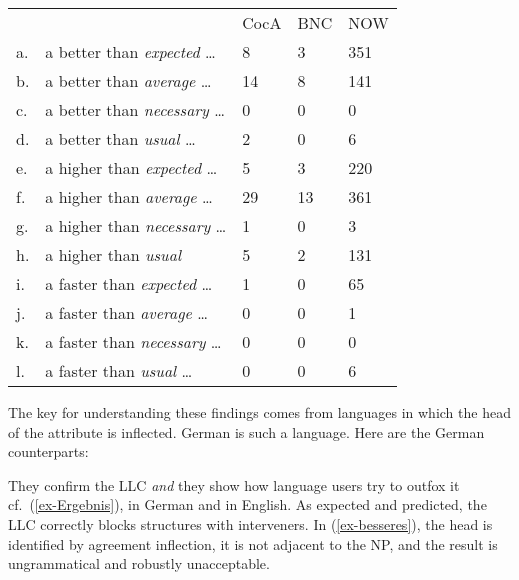 \documentclass[output=paper
  ,nobabel
  ,uniformtopskip %
]{langscibook}
\begin{document}
\ea\label{ex-than}
\begin{tabular}[t]{lllll}
& & CocA & BNC & NOW\\
a. & a better than \emph{expected} \ldots & 8 & 3 & 351\\
b. & a better than \emph{average} \ldots & 14 & 8 & 141\\
c. & a better than \emph{necessary} \ldots & 0 & 0 & 0\\
d. & a better than \emph{usual} \ldots & 2 & 0 & 6\\
e. & a higher than \emph{expected} \ldots & 5 & 3 & 220\\
f. & a higher than \emph{average} \ldots & 29 & 13 & 361\\
g. & a higher than \emph{necessary} \ldots & 1 & 0 & 3\\
h. & a higher than \emph{usual} & 5 & 2 & 131\\
i. & a faster than \emph{expected} \ldots & 1 & 0 & 65\\
j. & a faster than \emph{average} \ldots & 0 & 0 & 1\\
k. & a faster than \emph{necessary} \ldots & 0 & 0 & 0\\
l. & a faster than \emph{usual} \ldots & 0 & 0 & 6
\end{tabular}
\z

\noindent
The key for understanding these findings comes from languages in which the head of the attribute is
inflected. German is such a language. Here are the German counterparts:

\eal\label{ex-besseres}


\zl

\noindent
They confirm the LLC \emph{and} they show how language users try to outfox it cf.\ (\ref{ex-Ergebnis}), in German and in English. As expected and predicted, the LLC correctly blocks structures with interveners. In (\ref{ex-besseres}), the head is identified by agreement inflection, it is not adjacent to the NP, and the result is ungrammatical and robustly unacceptable.
\end{document}
